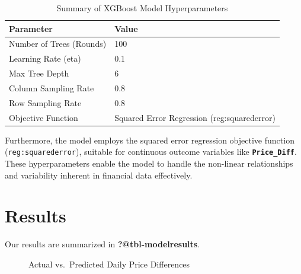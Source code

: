 \documentclass[
  letterpaper,
  DIV=11,
  numbers=noendperiod]{scrartcl}
\begin{document}
\begin{longtable}[t]{ll}

\caption{\label{tbl-modelsummary}Summary of XGBoost Model
Hyperparameters}

\tabularnewline

\toprule
Parameter & Value\\
\midrule
Number of Trees (Rounds) & 100\\
Learning Rate (eta) & 0.1\\
Max Tree Depth & 6\\
Column Sampling Rate & 0.8\\
Row Sampling Rate & 0.8\\
\addlinespace
Objective Function & Squared Error Regression (reg:squarederror)\\
\bottomrule

\end{longtable}

Furthermore, the model employs the squared error regression objective
function (\texttt{reg:squarederror}), suitable for continuous outcome
variables like \textbf{\texttt{Price\_Diff}}. These hyperparameters
enable the model to handle the non-linear relationships and variability
inherent in financial data effectively.

\section{Results}\label{results}

Our results are summarized in \textbf{?@tbl-modelresults}.

\begin{figure}


\caption{\label{fig-pred-price}Actual vs.~Predicted Daily Price
Differences}

\end{figure}%
\end{document}
